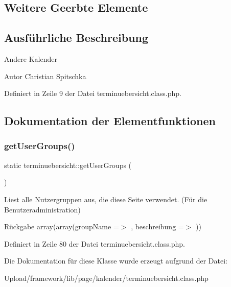 \subsection*{Weitere Geerbte Elemente}


\subsection{Ausführliche Beschreibung}
Andere Kalender

\begin{DoxyAuthor}{Autor}
Christian Spitschka 
\end{DoxyAuthor}


Definiert in Zeile 9 der Datei terminuebersicht.\+class.\+php.



\subsection{Dokumentation der Elementfunktionen}
\mbox{\label{classterminuebersicht_a791fcd31097bfc31234e2886a8f2f23d}} 
\subsubsection{\texorpdfstring{get\+User\+Groups()}{getUserGroups()}}
{\footnotesize\ttfamily static terminuebersicht\+::get\+User\+Groups (\begin{DoxyParamCaption}{ }\end{DoxyParamCaption})\hspace{0.3cm}{\ttfamily [static]}}

Liest alle Nutzergruppen aus, die diese Seite verwendet. (Für die Benutzeradministration) \begin{DoxyReturn}{Rückgabe}
array(array(\textquotesingle{}group\+Name\textquotesingle{} =$>$ \textquotesingle{}\textquotesingle{}, \textquotesingle{}beschreibung\textquotesingle{} =$>$ \textquotesingle{}\textquotesingle{})) 
\end{DoxyReturn}


Definiert in Zeile 80 der Datei terminuebersicht.\+class.\+php.



Die Dokumentation für diese Klasse wurde erzeugt aufgrund der Datei\+:\begin{DoxyCompactItemize}
\item 
Upload/framework/lib/page/kalender/terminuebersicht.\+class.\+php\end{DoxyCompactItemize}
